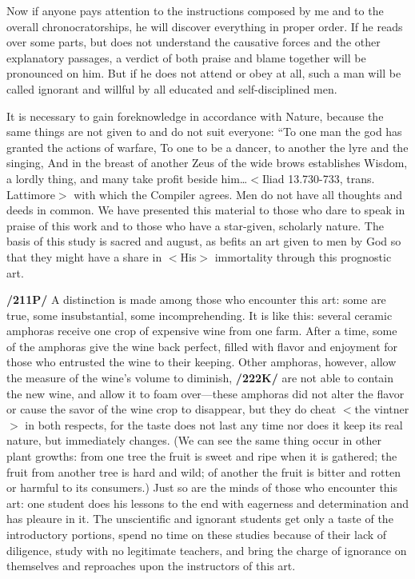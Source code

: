 Now if anyone pays attention to the instructions composed by me and to the overall chronocratorships, he will discover everything in proper order. If he reads over some parts, but does not understand the
causative forces and the other explanatory passages, a verdict of both praise and blame together will be pronounced on him. But if he does not attend or obey at all, such a man will be called ignorant and willful
by all educated and self-disciplined men.

It is necessary to gain foreknowledge in accordance with Nature, because the same things are not given to and do not suit everyone:
“To one man the god has granted the actions of warfare, To one to be a dancer, to another the lyre and the singing, And in the breast of another Zeus of the wide brows establishes Wisdom, a lordly thing, and many take profit beside him…$<$Iliad 13.730-733, trans. Lattimore$>$ with which the Compiler agrees. Men do not have all thoughts and deeds in common. We have presented this material to those who dare to speak in praise of this work and to those who
have a star-given, scholarly nature. The basis of this study is sacred and august, as befits an art given to men by God so that they might have a share in $<$His$>$ immortality through this prognostic art. 

\textbf{/211P/} A distinction is made among those who encounter this art: some are true, some insubstantial, some incomprehending. It is like this: several ceramic amphoras receive one crop of expensive wine from one farm. After a time, some of the amphoras give the wine back perfect, filled with flavor and enjoyment for those who entrusted the wine to their keeping. Other amphoras, however, allow the measure of the wine’s volume to diminish, \textbf{/222K/} are not able to contain the new wine, and allow it to foam over—these
amphoras did not alter the flavor or cause the savor of the wine crop to disappear, but they do cheat $<$the vintner$>$ in both respects, for the taste does not last any time nor does it keep its real nature, but immediately changes. (We can see the same thing occur in other plant growths: from one tree the fruit is sweet and ripe when it is gathered; the fruit from another tree is hard and wild; of another the fruit is bitter and rotten or harmful to its consumers.) Just so are the minds of those who encounter this art: one student does his lessons to the end with eagerness and determination and has pleaure in it. The unscientific and ignorant students get only a taste of the introductory portions, spend no time on these studies because of
their lack of diligence, study with no legitimate teachers, and bring the charge of ignorance on themselves and reproaches upon the instructors of this art. 

